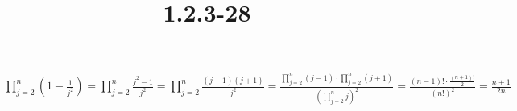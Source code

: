 \documentclass{article}
\title{1.2.3-28}
\begin{document}
\maketitle

$\prod_{j=2}^n(1-\frac{1}{j^2}) = \prod_{j=2}^n\frac{j^2-1}{j^2} = \prod_{j=2}^n\frac{(j-1)(j+1)}{j^2} = \frac{\prod_{j=2}^n(j-1) \cdot \prod_{j=2}^n(j+1)}{(\prod_{j=2}^n j)^2} = \frac{(n-1)!\cdot \frac{(n+1)!}{2}}{(n!)^2} = \frac{n+1}{2n}$
\end{document}
